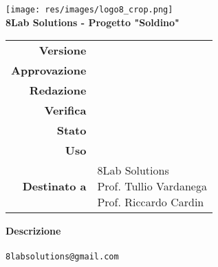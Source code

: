 \thispagestyle{empty}
\begin{titlepage}
	\begin{center}
		\texttt{[image: res/images/logo8\_crop.png]}\\
		\large \textbf{8Lab Solutions - Progetto "Soldino"} \\
		\vfill
		\Huge \textbf{\doctitle}
		\vspace*{\fill}
        
        \vfill
        \large

        \begin{tabular}{r|l}
                        \textbf{Versione} & \rev{} \\
                        \textbf{Approvazione} & \approv{} \\
                        \textbf{Redazione} & \red{} \\
                        \textbf{Verifica} & \ver{} \\
                        \textbf{Stato} & \stato{} \\
                        \textbf{Uso} & \uso{} \\
                        \textbf{Destinato a} & \parbox[t]{5cm}{8Lab Solutions
                        \\Prof. Tullio Vardanega\\Prof. Riccardo Cardin}
                \end{tabular}
                \vfill
                \normalsize
                \textbf{Descrizione} \\ \describedoc{} \\
                \vfill
                \small
                \texttt{8labsolutions@gmail.com}

	\end{center}
\end{titlepage}